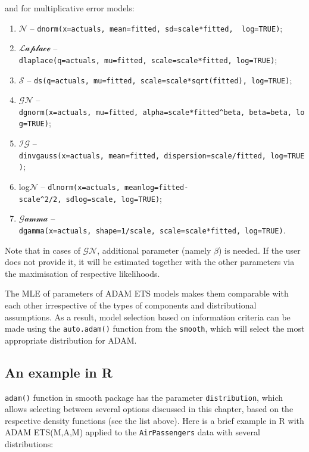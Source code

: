 \documentclass[
]{book}
\providecommand{\tightlist}{%
  \setlength{\itemsep}{0pt}\setlength{\parskip}{0pt}}
\theoremstyle{definition}
\theoremstyle{definition}
\theoremstyle{definition}
\theoremstyle{definition}
\theoremstyle{remark}
\begin{document}
and for multiplicative error models:

\begin{enumerate}
\def\labelenumi{\arabic{enumi}.}
\tightlist
\item
  \(\mathcal{N}\) -- \texttt{dnorm(x=actuals,\ mean=fitted,\ sd=scale*fitted,\ \ log=TRUE)};
\item
  \(\mathcal{Laplace}\) -- \texttt{dlaplace(q=actuals,\ mu=fitted,\ scale=scale*fitted,\ log=TRUE)};
\item
  \(\mathcal{S}\) -- \texttt{ds(q=actuals,\ mu=fitted,\ scale=scale*sqrt(fitted),\ log=TRUE)};
\item
  \(\mathcal{GN}\) -- \texttt{dgnorm(x=actuals,\ mu=fitted,\ alpha=scale*fitted\^{}beta,\ beta=beta,\ log=TRUE)};
\item
  \(\mathcal{IG}\) -- \texttt{dinvgauss(x=actuals,\ mean=fitted,\ dispersion=scale/fitted,\ log=TRUE)};
\item
  log\(\mathcal{N}\) -- \texttt{dlnorm(x=actuals,\ meanlog=fitted-scale\^{}2/2,\ sdlog=scale,\ log=TRUE)};
\item
  \(\mathcal{Gamma}\) -- \texttt{dgamma(x=actuals,\ shape=1/scale,\ scale=scale*fitted,\ log=TRUE)}.
\end{enumerate}

Note that in cases of \(\mathcal{GN}\), additional parameter (namely \(\beta\)) is needed. If the user does not provide it, it will be estimated together with the other parameters via the maximisation of respective likelihoods.

The MLE of parameters of ADAM ETS models makes them comparable with each other irrespective of the types of components and distributional assumptions. As a result, model selection based on information criteria can be made using the \texttt{auto.adam()} function from the \texttt{smooth}, which will select the most appropriate distribution for ADAM.

\hypertarget{an-example-in-r-1}{%
\subsection{An example in R}\label{an-example-in-r-1}}

\texttt{adam()} function in smooth package has the parameter \texttt{distribution}, which allows selecting between several options discussed in this chapter, based on the respective density functions (see the list above). Here is a brief example in R with ADAM ETS(M,A,M) applied to the \texttt{AirPassengers} data with several distributions:
\end{document}
